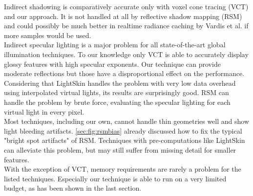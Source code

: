 \documentclass[thesis.tex]{subfiles}
\begin{document}
Indirect shadowing is comparatively accurate only with voxel cone tracing (VCT) \cite{bib:voxelconetracing} and our approach.
It is not handled at all by reflective shadow mapping (RSM) \cite{bib:reflectiveshadowmaps} and could possibly be much better in realtime radiance caching by Vardis et al. \cite{bib:radiancecachechromaticcompression} if more samples would be used.
\\
Indirect specular lighting is a major problem for all state-of-the-art global illumination techniques.
To our knowledge only VCT is able to accurately display glossy features with high specular exponents.
Our technique can provide moderate reflections but those have a disproportional effect on the performance.
Considering that LightSkin \cite{bib:LightskinPaper} handles the problem with very low data overhead using interpolated virtual lights, its results are surprisingly good.
RSM can handle the problem by brute force, evaluating the specular lighting for each virtual light in every pixel.
\\
Most techniques, including our own, cannot handle thin geometries well and show light bleeding artifacts.
\autoref{sec:fig:rsmbias} already discussed how to fix the typical "bright spot artifacts" of RSM.
Techniques with pre-computations like LightSkin can alleviate this problem, but may still suffer from missing detail for smaller features.
\\
With the exception of VCT, memory requirements are rarely a problem for the listed techniques.
Especially our technique is able to run on a very limited budget, as has been shown in the last section.
\end{document}
